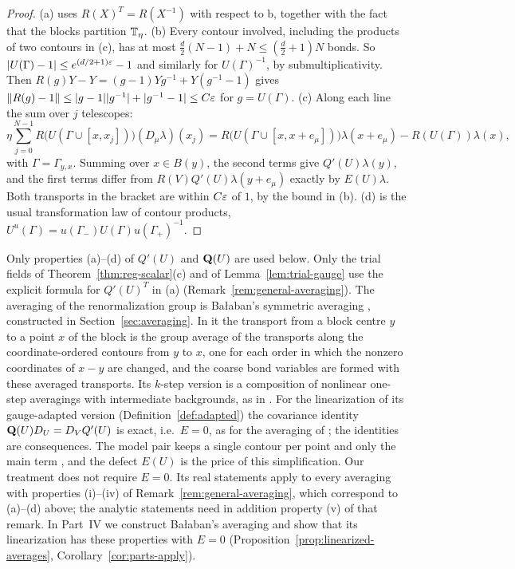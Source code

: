 \begin{proof}
(a) uses $R(X)^T=R(X^{-1})$ with respect to $\mathrm b$, together with the fact that the blocks partition $\mathbb T_\eta$. (b) Every contour involved, including the products of two contours in (c), has at most $\frac d2(N-1)+N\le(\frac d2+1)N$ bonds. So $|U(\Gamma)-1|\le e^{(d/2+1)\varepsilon}-1$ and similarly for $U(\Gamma)^{-1}$, by submultiplicativity. Then $R(g)Y-Y=(g-1)Yg^{-1}+Y(g^{-1}-1)$ gives $\|R(g)-1\|\le|g-1||g^{-1}|+|g^{-1}-1|\le C\varepsilon$ for $g=U(\Gamma)$. (c) Along each line the sum over $j$ telescopes:
\[
\eta\sum_{j=0}^{N-1}R\big(U(\Gamma\cup[x,x_j])\big)(D_\mu\lambda)(x_j)=R\big(U(\Gamma\cup[x,x+e_\mu])\big)\lambda(x+e_\mu)-R(U(\Gamma))\lambda(x),
\]
with $\Gamma=\Gamma_{y,x}$. Summing over $x\in B(y)$, the second terms give $Q'(U)\lambda(y)$, and the first terms differ from $R(V)Q'(U)\lambda(y+e_\mu)$ exactly by $E(U)\lambda$. Both transports in the bracket are within $C\varepsilon$ of $1$, by the bound in (b). (d) is the usual transformation law of contour products, $U^u(\Gamma)=u(\Gamma_-)U(\Gamma)u(\Gamma_+)^{-1}$.
\end{proof}

\begin{remark}\label{x:12.6}
Only properties (a)--(d) of $Q'(U)$ and $\mathbf Q(U)$ are used below. Only the trial fields of Theorem~\ref{thm:reg-scalar}(c) and of Lemma~\ref{lem:trial-gauge} use the explicit formula for $Q'(U)^T$ in (a) (Remark~\ref{rem:general-averaging}). The averaging of the renormalization group is Ba\l aban's symmetric averaging \cite[(0.12)]{BalYM4I}, constructed in Section~\ref{sec:averaging}. In it the transport from a block centre $y$ to a point $x$ of the block is the group average of the transports along the coordinate-ordered contours from $y$ to $x$, one for each order in which the nonzero coordinates of $x-y$ are changed, and the coarse bond variables are formed with these averaged transports. Its $k$-step version is a composition of nonlinear one-step averagings with intermediate backgrounds, as in \cite[(3.15)]{BalBackground}. For the linearization of its gauge-adapted version (Definition~\ref{def:adapted}) the covariance identity $\mathbf Q(U)D_U=D_VQ'(U)$ is exact, i.e.\ $E=0$, as for the averaging of \cite[(3.114)--(3.115)]{BalBackground}; the identities \cite[(3.124), (3.152)]{BalBackground} are consequences. The model pair keeps a single contour per point and only the main term \cite[(125)]{BalAvg}, and the defect $E(U)$ is the price of this simplification. Our treatment does not require $E=0$. Its real statements apply to every averaging with properties (i)--(iv) of Remark~\ref{rem:general-averaging}, which correspond to (a)--(d) above; the analytic statements need in addition property (v) of that remark. In Part~IV we construct Ba\l aban's averaging and show that its linearization has these properties with $E=0$ (Proposition~\ref{prop:linearized-averages}, Corollary~\ref{cor:parts-apply}).
\end{remark}
